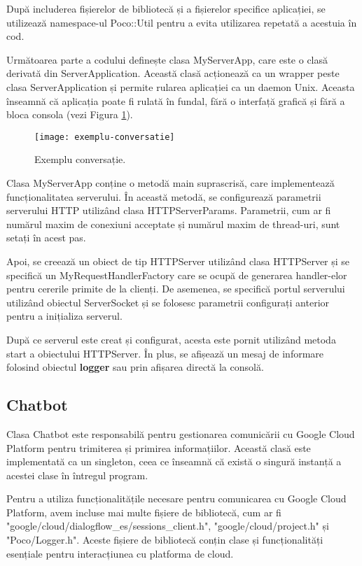 După includerea fișierelor de bibliotecă și a fișierelor specifice aplicației, se utilizează namespace-ul Poco::Util pentru a evita utilizarea repetată a acestuia în cod.

Următoarea parte a codului definește clasa MyServerApp, care este o clasă derivată din ServerApplication. Această clasă acționează ca un wrapper peste clasa ServerApplication și permite rularea aplicației ca un daemon Unix. Aceasta înseamnă că aplicația poate fi rulată în fundal, fără o interfață grafică și fără a bloca consola (vezi Figura \ref{fig:exempluConversatie}).

\begin{figure}[h]
    \centering
    \texttt{[image: exemplu-conversatie]}
    \caption{Exemplu conversație.}
    \label{fig:exempluConversatie}
\end{figure}

Clasa MyServerApp conține o metodă main suprascrisă, care implementează funcționalitatea serverului. În această metodă, se configurează parametrii serverului HTTP utilizând clasa HTTPServerParams. Parametrii, cum ar fi numărul maxim de conexiuni acceptate și numărul maxim de thread-uri, sunt setați în acest pas.

Apoi, se creează un obiect de tip HTTPServer utilizând clasa HTTPServer și se specifică un MyRequestHandlerFactory care se ocupă de generarea handler-elor pentru cererile primite de la clienți. De asemenea, se specifică portul serverului utilizând obiectul ServerSocket și se folosesc parametrii configurați anterior pentru a inițializa serverul.

După ce serverul este creat și configurat, acesta este pornit utilizând metoda start a obiectului HTTPServer. În plus, se afișează un mesaj de informare folosind obiectul \textbf{logger} sau prin afișarea directă la consolă.

\subsection{Chatbot}

Clasa Chatbot este responsabilă pentru gestionarea comunicării cu Google Cloud Platform pentru trimiterea și primirea informațiilor. Această clasă este implementată ca un singleton, ceea ce înseamnă că există o singură instanță a acestei clase în întregul program.

Pentru a utiliza funcționalitățile necesare pentru comunicarea cu Google Cloud Platform, avem incluse mai multe fișiere de bibliotecă, cum ar fi "google/cloud/dialogflow\_es/sessions\_client.h", "google/cloud/project.h" și "Poco/Logger.h". Aceste fișiere de bibliotecă conțin clase și funcționalități esențiale pentru interacțiunea cu platforma de cloud.

